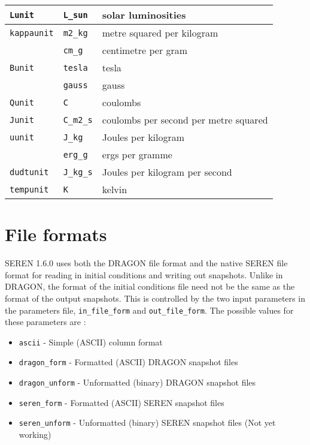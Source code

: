 \documentclass[a4paper]{article}
\newcommand{\VERNO}{1.6.0 }
\newcommand{\var}[1]{\texttt{#1}}
\begin{document}
\begin{center}
\begin{supertabular}{|p{3cm}|p{3cm}|p{6cm}|}
\var{Lunit}     & \var{L\_sun}    & solar luminosities \\ \hline
\var{kappaunit} & \var{m2\_kg}    & metre squared per kilogram \\
                & \var{cm\_g}     & centimetre per gram \\ 
\hline
\var{Bunit}     & \var{tesla}     & tesla \\
                & \var{gauss}     & gauss \\
\hline
\var{Qunit}     & \var{C}         & coulombs \\
\hline
\var{Junit}     & \var{C\_m2\_s}  & coulombs per second per metre squared \\
\hline
\var{uunit}     & \var{J\_kg}     & Joules per kilogram \\
                & \var{erg\_g}    & ergs per gramme \\ \hline
\var{dudtunit}  & \var{J\_kg\_s}  & Joules per kilogram per second \\ \hline
\var{tempunit}  & \var{K}         & kelvin \\
\end{supertabular}
\end{center}


\newpage


\section{File formats}
SEREN \VERNO uses both the DRAGON file format and the native SEREN file format for reading in initial conditions and writing out snapshots.  Unlike in DRAGON, the format of the initial conditions file need not be the same as the format of the output snapshots.  This is controlled by the two input parameters in the parameters file, \var{in\_file\_form} and \var{out\_file\_form}.  The possible values for these parameters are : 
\begin{itemize}
\item \var{ascii} - Simple (ASCII) column format
\item \var{dragon\_form} - Formatted (ASCII) DRAGON snapshot files
\item \var{dragon\_unform} - Unformatted (binary) DRAGON snapshot files
\item \var{seren\_form} - Formatted (ASCII) SEREN snapshot files
\item \var{seren\_unform} - Unformatted (binary) SEREN snapshot files (Not yet working)
\end{itemize}
\end{document}
